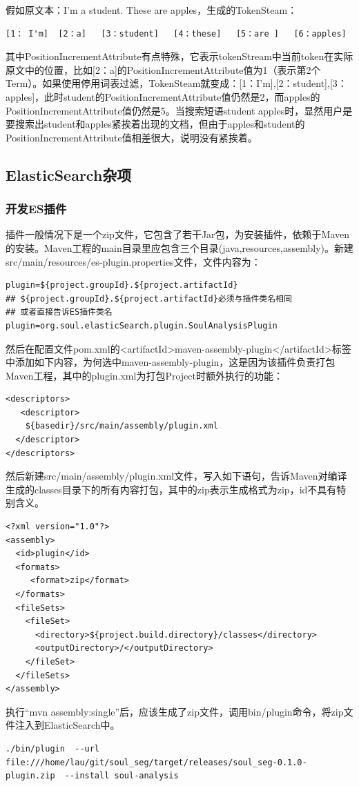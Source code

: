 \par 假如原文本：I'm a student. These are apples，生成的TokenSteam：
\begin{verbatim}
[1： I'm]  [2：a]   [3：student]   [4：these]   [5：are ]   [6：apples]
\end{verbatim}
\par 其中PositionIncrementAttribute有点特殊，它表示tokenStream中当前token在实际原文中的位置，比如[2：a]的PositionIncrementAttribute值为1（表示第2个Term）。如果使用停用词表过滤，TokenSteam就变成：[1：I'm],[2：student],[3：apples]，此时student的PositionIncrementAttribute值仍然是2，而apples的PositionIncrementAttribute值仍然是5。当搜索短语student apples时，显然用户是要搜索出student和apples紧挨着出现的文档，但由于apples和student的PositionIncrementAttribute值相差很大，说明没有紧挨着。
\subsection{ElasticSearch杂项}
\subsubsection{开发ES插件}
\par 插件一般情况下是一个zip文件，它包含了若干Jar包，为安装插件，依赖于Maven的安装。Maven工程的main目录里应包含三个目录(java,resources,assembly)。新建src/main/resources/es-plugin.properties文件，文件内容为：
\begin{verbatim}
plugin=${project.groupId}.${project.artifactId}
## ${project.groupId}.${project.artifactId}必须与插件类名相同
## 或者直接告诉ES插件类名
plugin=org.soul.elasticSearch.plugin.SoulAnalysisPlugin
\end{verbatim}
\par 然后在配置文件pom.xml的<artifactId>maven-assembly-plugin</artifactId>标签中添加如下内容，为何选中maven-assembly-plugin，这是因为该插件负责打包Maven工程，其中的plugin.xml为打包Project时额外执行的功能：
\begin{verbatim}
<descriptors>
   <descriptor>
    ${basedir}/src/main/assembly/plugin.xml
  </descriptor>
</descriptors>
\end{verbatim}
\par 然后新建src/main/assembly/plugin.xml文件，写入如下语句，告诉Maven对编译生成的classes目录下的所有内容打包，其中的zip表示生成格式为zip，id不具有特别含义。
\begin{verbatim}
<?xml version="1.0"?>
<assembly>
  <id>plugin</id>
  <formats>
     <format>zip</format>
  </formats>
  <fileSets>  
    <fileSet>  
      <directory>${project.build.directory}/classes</directory>
      <outputDirectory>/</outputDirectory>  
    </fileSet>  
  </fileSets>
</assembly>
\end{verbatim}
\par 执行“mvn assembly:single”后，应该生成了zip文件，调用bin/plugin命令，将zip文件注入到ElasticSearch中。
\begin{verbatim}
./bin/plugin  --url file:///home/lau/git/soul_seg/target/releases/soul_seg-0.1.0-plugin.zip  --install soul-analysis
\end{verbatim}

